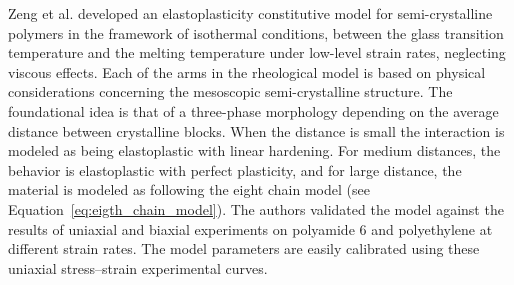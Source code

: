 Zeng et al. \citep{zengConstitutiveModelSemicrystalline2010} developed an elastoplasticity constitutive model for semi-crystalline polymers in the framework of isothermal conditions, between the glass transition temperature and the melting temperature under low-level strain rates, neglecting viscous effects.
Each of the arms in the rheological model is based on physical considerations concerning the mesoscopic semi-crystalline structure.
The foundational idea is that of a three-phase morphology depending on the average distance between crystalline blocks.
When the distance is small the interaction is modeled as being elastoplastic with linear hardening.
For medium distances, the behavior is elastoplastic with perfect plasticity, and for large distance, the material is modeled as following the eight chain model (see Equation~\eqref{eq:eigth_chain_model}).
The authors validated the model against the results of uniaxial and biaxial experiments on polyamide 6 and polyethylene at different strain rates.
The model parameters are easily calibrated using these uniaxial stress–strain experimental curves.


